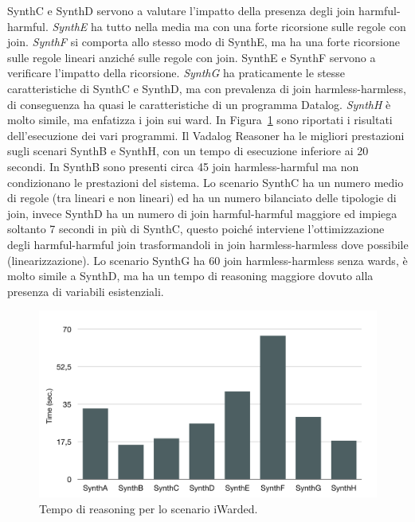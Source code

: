 SynthC e SynthD servono a valutare l'impatto della presenza degli join harmful-harmful. \newline
\emph{SynthE} ha tutto nella media ma con una forte ricorsione sulle regole con join. \emph{SynthF} si comporta allo stesso modo di SynthE, ma ha una forte ricorsione sulle regole lineari anziché sulle regole con join. \newline
SynthE e SynthF servono a verificare l'impatto della ricorsione. \newline
\emph{SynthG} ha praticamente le stesse caratteristiche di SynthC e SynthD, ma con prevalenza di join harmless-harmless, di conseguenza ha quasi le caratteristiche di un programma Datalog. \emph{SynthH} è molto simile, ma enfatizza i join sui ward. \newline \newline
In Figura~\ref{fig:iwardedresult} sono riportati i risultati dell'esecuzione dei vari programmi. Il Vadalog Reasoner ha le migliori prestazioni sugli scenari SynthB e SynthH, con un tempo di esecuzione inferiore ai 20 secondi. \newline
In SynthB sono presenti circa 45 join harmless-harmful ma non condizionano le prestazioni del sistema. Lo scenario SynthC ha un numero medio di regole (tra lineari e non lineari) ed ha un numero bilanciato delle tipologie di join, invece SynthD ha un numero di join harmful-harmful maggiore ed impiega soltanto 7 secondi in più di SynthC, questo poiché interviene l'ottimizzazione degli harmful-harmful join trasformandoli in join harmless-harmless dove possibile (linearizzazione). Lo scenario SynthG ha 60 join harmless-harmless senza wards, è molto simile a SynthD, ma ha un tempo di reasoning maggiore dovuto alla presenza di variabili esistenziali. 
\begin{figure}[h]
	\centering
	\includegraphics[width=0.8\linewidth]{figure/iWardedResult}
	\caption{Tempo di reasoning per lo scenario iWarded.}
	\label{fig:iwardedresult}
\end{figure}

